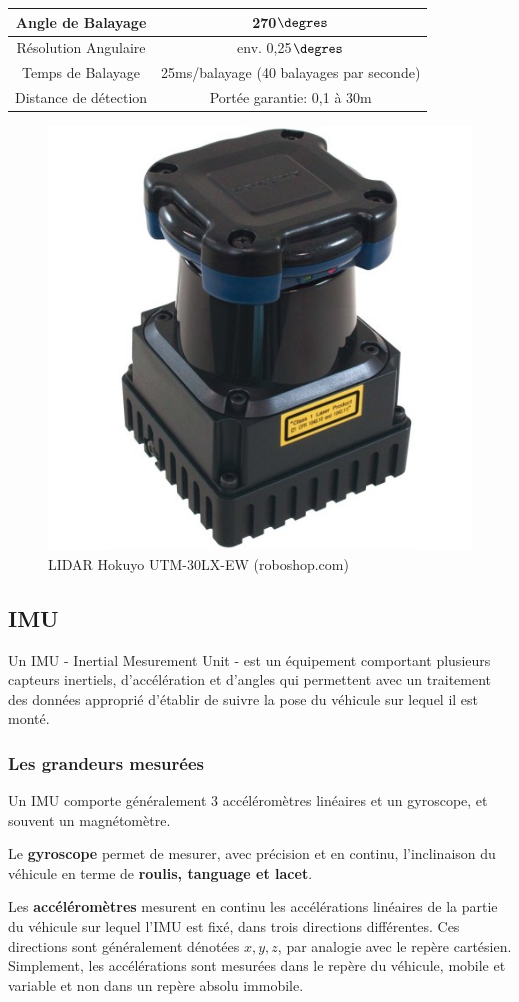 \documentclass[12pt,a4paper]{report}
\begin{document}
		\begin{center}
		\begin{tabular}{|c|c|}
			\hline 
			Angle de Balayage & 270$\degres$ \\ 
			\hline 
			Résolution Angulaire & env. 0,25$\degres$ \\ 
			\hline
			Temps de Balayage & 25ms/balayage (40 balayages par seconde) \\
			\hline
			Distance de détection & Portée garantie: 0,1 à 30m \\
			\hline
		\end{tabular} 
		\end{center}
	
		\begin{figure}[h!]
			\centering
			\includegraphics[width=0.3\linewidth]{img/hokuyo-utm-30lx-ew-scanning-laser-rangefinder}
			\caption[hokuyo]{LIDAR Hokuyo UTM-30LX-EW (roboshop.com)}
			\label{fig:hokuyo-utm-30lx-ew-scanning-laser-rangefinder}
		\end{figure}
		
		\subsection{IMU}
		Un IMU - Inertial Mesurement Unit - est un équipement comportant plusieurs capteurs inertiels, d'accélération et d'angles qui permettent avec un traitement des données approprié d'établir de suivre la pose du véhicule sur lequel il est monté.
		
		\subsubsection{Les grandeurs mesurées}
		Un IMU comporte généralement 3 accéléromètres linéaires et un gyroscope, et souvent un magnétomètre.
		
		\para Le \textbf{gyroscope} permet de mesurer, avec précision et en continu, l'inclinaison du véhicule en terme de \textbf{roulis, tanguage et lacet}. 
		
		\para Les \textbf{accéléromètres} mesurent en continu les accélérations linéaires de la partie du véhicule sur lequel l'IMU est fixé, dans trois directions différentes. Ces directions sont généralement dénotées $x,y,z$, par analogie avec le repère cartésien. Simplement, les accélérations sont mesurées dans le repère du véhicule, mobile et variable et non dans un repère absolu immobile.
		
\end{document}
